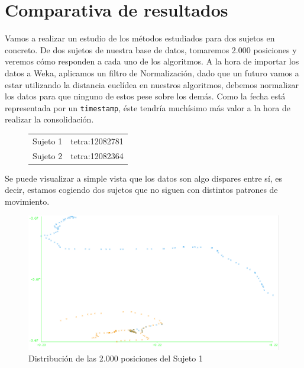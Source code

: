 \documentclass[a4paper, 12pt]{article}
\begin{document}
\pagebreak
\section{Comparativa de resultados}

Vamos a realizar un estudio de los m\'etodos estudiados para dos sujetos en concreto. De dos sujetos de nuestra base de datos, tomaremos 2.000 posiciones y veremos c\'omo responden a cada uno de los algoritmos. A la hora de importar los datos a Weka, aplicamos un filtro de Normalizaci\'on, dado que un futuro vamos a estar utilizando la distancia eucl\'idea en nuestros algoritmos, debemos normalizar los datos para que ninguno de estos pese sobre los dem\'as. Como la fecha est\'a representada por un \texttt{timestamp}, \'este tendr\'ia much\'isimo m\'as valor a la hora de realizar la consolidaci\'on.

\begin{figure}[H]
	\begin{tabular}{| l | l |}
	\hline
		Sujeto 1 & tetra:12082781 \\
		Sujeto 2 & tetra:12082364 \\	
	\hline
	\end{tabular}
\end{figure}

Se puede visualizar a simple vista que los datos son algo dispares entre s\'i, es decir, estamos cogiendo dos sujetos que no siguen con distintos patrones de movimiento. \\

\begin{figure}[H]
	\includegraphics[scale=.5]{../comparativa/sujeto1.png}
	\caption{Distribuci\'on de las 2.000 posiciones del Sujeto 1}
\end{figure}
\end{document}
